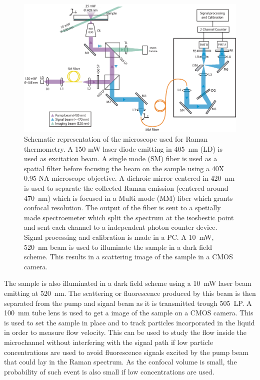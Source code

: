 \documentclass[]{spie}  %
\begin{document}
\begin{figure}[h!]
\centering
\includegraphics[width =\textwidth]{figs/fig1.eps}
\caption{Schematic representation of the microscope used for Raman thermometry. A 150 mW laser diode emitting in 405~nm (LD) is used as excitation beam. A single mode (SM) fiber is used as a spatial filter before focusing the beam on the sample using a 40X 0.95 NA microscope objective. A dichroic mirror centered in 420~nm is used to separate the collected Raman emission (centered around 470~nm) which is focused in a Multi mode (MM) fiber which grants confocal resolution. The output of the fiber is sent to a spetially made spectroemeter which split the spectrum at the isosbestic point and sent each channel to a independent photon counter device. Signal processing and calibration is made in a PC. A 10~mW, 520~nm beam is used to illuminate the sample in a dark field scheme. This results in a scattering image of the sample in a CMOS camera.
\label{fig:setup}}
\end{figure}

The sample is also illuminated in a dark field scheme using a 10~mW laser beam emitting at 520~nm. The scattering or fluorescence produced by this beam is then separated from the pump and signal beam as it is transmitted trough 505~LP. A 100~mm tube lens is used to get a image of the sample on a CMOS camera. This is used to set the sample in place and to track particles incorporated in the liquid in order to measure flow velocity. This can be used to study the flow inside the microchannel without interfering with the signal path if low particle concentrations are used to avoid fluorescence signals excited by the pump beam that could lay in the Raman spectrum. As the confocal volume is small, the probability of such event is also small if low concentrations are used.   
\end{document}
